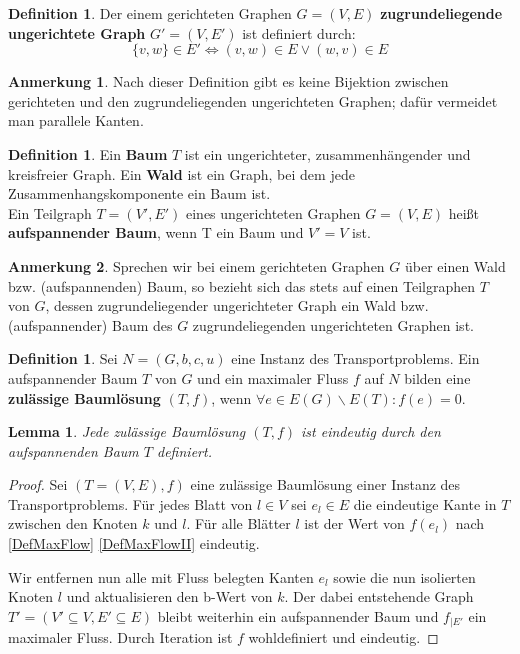 \documentclass[a4paper,twoside,ngerman]{report}
\theoremstyle{plain}
\newtheorem{lem}[thm]{Lemma}
\theoremstyle{definition}
\newtheorem{defn}[thm]{Definition}
\newtheorem*{anm}{Anmerkung}
\begin{document}
\begin{defn}Der einem gerichteten Graphen $G=(V,E)$ \textbf{zugrundeliegende ungerichtete Graph} $G'=(V,E')$ ist definiert durch:
\begin{equation*}\{v,w\}\in E' \iff (v,w) \in E \lor (w,v) \in E\end{equation*} \end{defn}
\begin{anm}Nach dieser Definition gibt es keine Bijektion zwischen gerichteten und den zugrundeliegenden ungerichteten Graphen; dafür vermeidet man parallele Kanten.\end{anm}

\begin{defn}Ein \textbf{Baum} $T$ ist ein ungerichteter, zusammenhängender und kreisfreier Graph. Ein \textbf{Wald} ist ein Graph, bei dem jede Zusammenhangskomponente ein Baum ist.\\
Ein Teilgraph $T=(V',E')$ eines ungerichteten Graphen $G=(V,E)$ heißt \textbf{aufspannender Baum}, wenn T ein Baum und $V'=V$ ist.\end{defn}
\begin{anm}Sprechen wir bei einem gerichteten Graphen $G$ über einen Wald bzw. (aufspannenden) Baum, so bezieht sich das stets auf einen Teilgraphen $T$ von $G$, dessen zugrundeliegender ungerichteter Graph ein Wald bzw. (aufspannender) Baum des $G$ zugrundeliegenden ungerichteten Graphen ist.\end{anm}

\begin{defn}Sei $N=(G,b,c,u)$ eine Instanz des Transportproblems. Ein aufspannender Baum $T$ von $G$ und ein maximaler Fluss $f$ auf $N$ bilden eine \textbf{zulässige Baumlösung} $(T,f)$, wenn $\forall e\in E(G)\backslash E(T): f(e) = 0$.\end{defn}

\begin{lem}\label{TreeUnique}Jede zulässige Baumlösung $(T,f)$ ist eindeutig durch den aufspannenden Baum $T$ definiert.\end{lem}
\begin{proof}Sei $(T=(V,E),f)$ eine zulässige Baumlösung einer Instanz des Transportproblems. Für jedes Blatt von $l\in V$ sei $e_l\in E$ die eindeutige Kante in $T$ zwischen den Knoten $k$ und $l$. Für alle Blätter $l$ ist der Wert von $f(e_l)$ nach \cref{DefMaxFlow} \cref{DefMaxFlowII} eindeutig.
	
Wir entfernen nun alle mit Fluss belegten Kanten $e_l$ sowie die nun isolierten Knoten $l$ und aktualisieren den b-Wert von $k$. Der dabei entstehende Graph $T'=(V'\subseteq V,E'\subseteq E)$ bleibt weiterhin ein aufspannender Baum und $f_{|E'}$ ein maximaler Fluss. Durch Iteration ist $f$ wohldefiniert und eindeutig.\end{proof}
\end{document}
